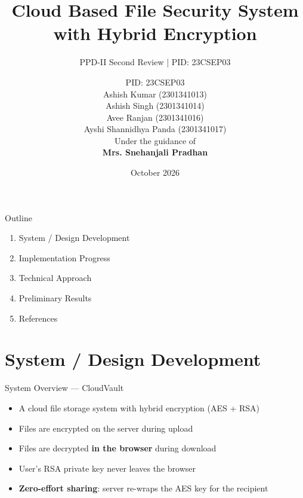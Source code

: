 \documentclass{SKP-beamer}
\title[Cloud File Security]{Cloud Based File Security System with Hybrid Encryption}
\subtitle{PPD-II Second Review \hspace{0.3cm} | \hspace{0.3cm} PID: 23CSEP03}
\author[23CSEP03]{PID: 23CSEP03 \\[0.3cm] \small{Ashish Kumar (2301341013)} \\[0.1cm] \small{Ashish Singh (2301341014)} \\[0.1cm] \small{Avee Ranjan (2301341016)} \\[0.1cm] \small{Ayshi Shannidhya Panda (2301341017)} \\[0.3cm] \small{Under the guidance of} \\ \textbf{Mrs. Snehanjali Pradhan}}
\institute[SIT]{
  Silicon Institute of Technology
}
\date{October 2026}
\begin{document}
\begin{frame}
  \titlepage
\end{frame}

\begin{frame}{Outline}
\begin{enumerate}
  \item System / Design Development
  \item Implementation Progress
  \item Technical Approach
  \item Preliminary Results
  \item References
\end{enumerate}
\end{frame}

\section{System / Design Development}

\begin{frame}{System Overview --- CloudVault}
\begin{itemize}
  \item A cloud file storage system with \alert{hybrid encryption} (AES + RSA)
  \item Files are encrypted on the server during upload
  \item Files are decrypted \textbf{in the browser} during download
  \item User's RSA private key \alert{never leaves the browser}
  \item \textbf{Zero-effort sharing}: server re-wraps the AES key for the recipient
\end{itemize}
\end{frame}
\end{document}

